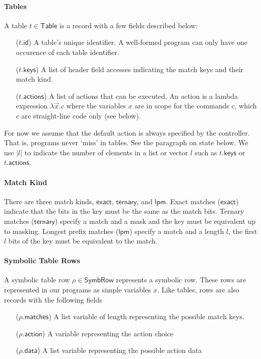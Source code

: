 \documentclass{article}
\newcommand{\Table}{\mathsf{Table}}
\newcommand{\SymbRow}{\mathsf{SymbRow}}
\newcommand{\matches}{\mathsf{matches}}
\newcommand{\action}{\mathsf{action}}
\newcommand{\actions}{\mathsf{actions}}
\newcommand{\keys}{\mathsf{keys}}
\newcommand{\data}{\mathsf{data}}
\newcommand{\id}{\mathsf{id}}
\newcommand{\exact}{\ensuremath{\mathsf{exact}}}
\newcommand{\ternary}{\ensuremath{\mathsf{ternary}}}
\newcommand{\lpm}{\ensuremath{\mathsf{lpm}}}
\begin{document}
\paragraph{Tables}
A table $t \in \Table$ is a record with a few fields described below:
\begin{enumerate}[align=left]
  \item[($t.\id$)] A table's unique identifier. A well-formed program can only have
    one occurence of each table identifier.
  \item[($t.\keys$)] A list of header field accesses indicating the match keys and their match kind.
  \item[($t.\actions$)] A list of actions that can be executed. An action is a lambda
    expression $\lambda \vec x. c$ where the variables $x$ are in scope for the
    commands $c$, which $c$ are straight-line code only (see below).
\end{enumerate}
For now we assume that the default action is always specified by the controller.
That is, programs never `miss' in tables. See the paragraph on state below. We use $|l|$ to indicate the number of
elements in a list or vector $l$ such as $t.\keys$ or $t.\actions$.

\paragraph{Match Kind}
There are three match kinds, \exact, \ternary, and \lpm. Exact matches (\exact)
indicate that the bits in the key must be the same as the match bits. Ternary
matches (\ternary) specify a match and a mask and the key must be equivalent up
to masking. Longest prefix matches (\lpm) specify a match and a length
$l$, the first $l$ bits of the key must be equivalent to the match.


\paragraph{Symbolic Table Rows}
A symbolic table row $\rho \in \SymbRow$ represents a symbolic row. These rows are represented in our programs as simple variables $x$. Like tables,
rows are also records with the following fields 
\begin{enumerate}[align=left]
  \item[($\rho.\matches$)] A list variable of length representing the possible match keys.
  \item[($\rho.\action$)] A variable representing the action choice
  \item[($\rho.\data$)] A list variable representing the possible action data
\end{enumerate}
\end{document}
